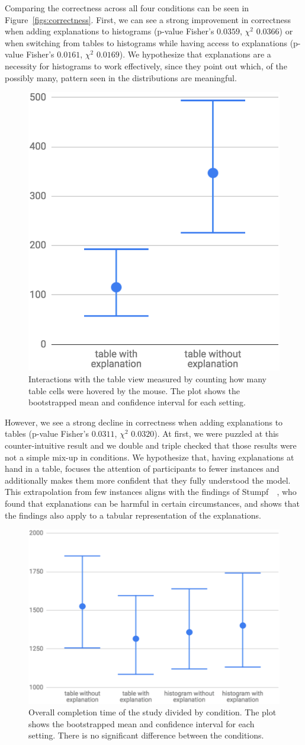 Comparing the correctness across all four conditions can be seen in Figure~\ref{figs:correctness}.
First, we can see a strong improvement in correctness when adding explanations to histograms (p-value Fisher's $0.0359$, $\chi^2$ $0.0366$) or when switching from tables to histograms while having access to explanations (p-value Fisher's $0.0161$, $\chi^2$ $0.0169$).
We hypothesize that explanations are a necessity for histograms to work effectively, since they point out which, of the possibly many, pattern seen in the distributions are meaningful.

\begin{figure}[t]
\centering
\includegraphics[width=0.25\linewidth]{aggexplain/table_interaction}
\caption[Interactions with the table view.]{
Interactions with the table view measured by counting how many table cells were hovered by the mouse.
The plot shows the bootstrapped mean and confidence interval for each setting.
}
\label{figs:table_interaction}
\end{figure}

However, we see a strong decline in correctness when adding explanations to tables (p-value Fisher's $0.0311$, $\chi^2$ $0.0320$).
At first, we were puzzled at this counter-intuitive result and we double and triple checked that those results were not a simple mix-up in conditions.
We hypothesize that, having explanations at hand in a table, focuses the attention of participants to fewer instances and additionally makes them more confident that they fully understood the model.
This extrapolation from few instances aligns with the findings of Stumpf~\etal~\cite{harmful}, who found that explanations can be harmful in certain circumstances, and shows that the findings also apply to a tabular representation of the explanations.

\begin{figure}
\centering
\includegraphics[width=0.4\linewidth]{aggexplain/timing2}
\caption[Overall completion time of the study divided by condition.]{
Overall completion time of the study divided by condition.
The plot shows the bootstrapped mean and confidence interval for each setting.
There is no significant difference between the conditions.
}
\label{figs:timing}
\end{figure}

